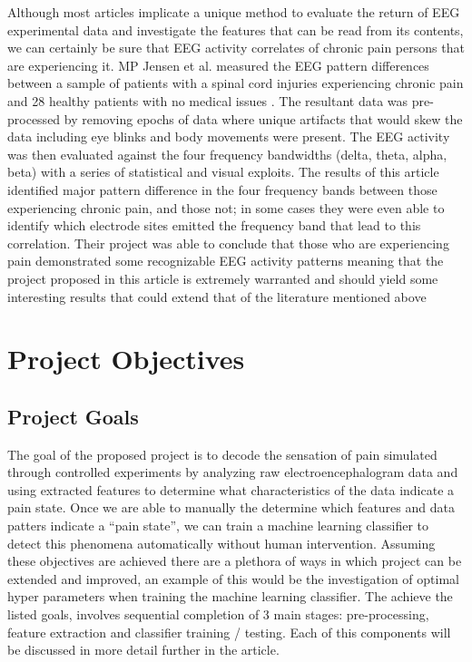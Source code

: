 \documentclass[12pt]{article}
\begin{document}
Although most articles implicate a unique method to evaluate the return of EEG experimental data and investigate the features that can be read from its contents, we can certainly be sure that EEG activity correlates of chronic pain persons that are experiencing it. MP Jensen et al. measured the EEG pattern differences between a sample of patients with a spinal cord injuries experiencing chronic pain and 28 healthy patients with no medical issues \cite{Jensen2013-ir}. The resultant data was pre-processed by removing epochs of data where unique artifacts that would skew the data including eye blinks and body movements were present. The EEG activity was then evaluated against the four frequency bandwidths (delta, theta, alpha, beta) with a series of statistical and visual exploits. The results of this article identified major pattern difference in the four frequency bands between those experiencing chronic pain, and those not; in some cases they were even able to identify which electrode sites emitted the frequency band that lead to this correlation. Their project was able to conclude that those who are experiencing pain demonstrated some recognizable EEG activity patterns meaning that the project proposed in this article is extremely warranted and should yield some interesting results that could extend that of the literature mentioned above 

\section{Project Objectives}
\subsection{Project Goals}
The goal of the proposed project is to decode the sensation of pain simulated through controlled experiments by analyzing raw electroencephalogram data and using extracted features to determine what characteristics of the data indicate a pain state. Once we are able to manually the determine which features and data patters indicate a “pain state”, we can train a machine learning classifier to detect this phenomena automatically without human intervention. Assuming these objectives are achieved there are a plethora of ways in which project can be extended and improved, an example of this would be the investigation of optimal hyper parameters when training the machine learning classifier. The achieve the listed goals, involves sequential completion of 3 main stages: pre-processing, feature extraction and classifier training / testing. Each of this components will be discussed in more detail further in the article.
\end{document}
